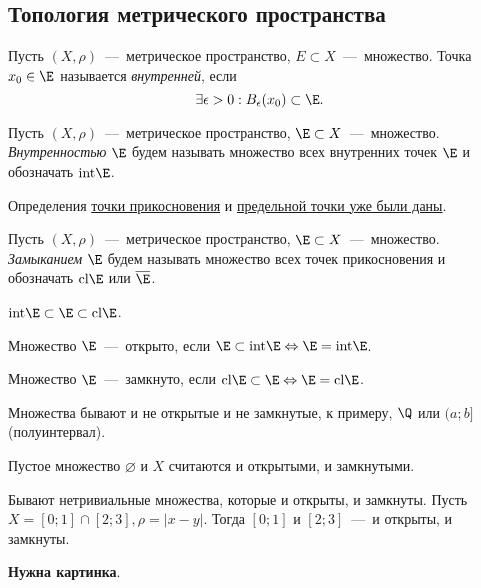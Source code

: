 \subsection{Топология метрического пространства}
\begin{definition}
    Пусть $(X, \rho)$~---~метрическое пространство, $E \subset X$~---~множество. Точка $x_{0} \in \E$ называется \textit{внутренней}, если
    $$ \exists \epsilon > 0: B_{\epsilon} (x_{0}) \subset \E.$$
\end{definition}
\begin{definition}
    Пусть $(X, \rho)$~---~метрическое пространство, $\E \subset X$~---~множество. \textit{Внутренностью} $\E$ будем называть множество всех внутренних точек $\E$ и обозначать $\text{int}\E$.
\end{definition}
\begin{note}
    Определения \hyperlink{def7.6}{точки прикосновения} и \hyperlink{def7.7}{предельной точки уже были даны}.
\end{note}
\begin{definition}
    Пусть $(X, \rho)$~---~метрическое пространство, $\E \subset X$~---~множество. \textit{Замыканием} $\E$ будем называть множество всех точек прикосновения и обозначать $\text{cl}\E$ или $\overline{\E}$.
\end{definition}
\begin{proposition}
    $\text{int}\E \subset \E \subset \text{cl}\E$.
\end{proposition}
\begin{definition}
    Множество $\E$~---~открыто, если $\E \subset \text{int}\E \Leftrightarrow \E = \text{int}\E$.
\end{definition}
\begin{definition}
    Множество $\E$~---~замкнуто, если $\text{cl}\E \subset \E \Leftrightarrow \E = \text{cl}\E$.
\end{definition}
\begin{note}
    Множества бывают и не открытые и не замкнутые, к примеру, $\Q$ или $(a; b]$ (полуинтервал).
\end{note}
\begin{definition}
    Пустое множество $\varnothing$ и $X$ считаются и открытыми, и замкнутыми.
\end{definition}
\begin{example}
    Бывают нетривиальные множества, которые и открыты, и замкнуты. Пусть $X = [0; 1] \cap [2; 3], \rho = |x - y|$. Тогда $[0; 1]$ и $[2; 3]$~---~и открыты, и замкнуты.

    \textbf{Нужна картинка}.
\end{example}
